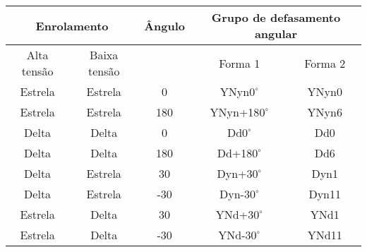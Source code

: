 \begin{table}[H]
\centering
\begin{tabular}{|c|c|c|c|c|}
\hline
\multicolumn{2}{|c|}{Enrolamento} & Ângulo & \multicolumn{2}{c|}{Grupo de defasamento angular} \\ \hline
Alta tensão     & Baixa tensão    &        & Forma 1                  & Forma 2                \\ \hline
Estrela         & Estrela         & 0      & YNyn$0^{\circ}$                   & YNyn0                  \\ \hline
Estrela         & Estrela         & 180    & YNyn+18$0^{\circ}$                & YNyn6                  \\ \hline
Delta           & Delta           & 0      & Dd$0^{\circ}$                    & Dd0                    \\ \hline
Delta           & Delta           & 180    & Dd+18$0^{\circ}$                  & Dd6                    \\ \hline
Delta           & Estrela         & 30     & Dyn+3$0^{\circ}$                  & Dyn1                   \\ \hline
Delta           & Estrela         & -30    & Dyn-3$0^{\circ}$                  & Dyn11                  \\ \hline
Estrela         & Delta           & 30     & YNd+3$0^{\circ}$                  & YNd1                   \\ \hline
Estrela         & Delta           & -30    & YNd-3$0^{\circ}$                  & YNd11                  \\ \hline
\end{tabular}
\end{table}